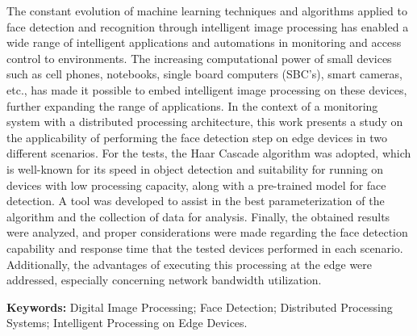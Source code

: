 \captionsenglish

\begin{resumo}
    The constant evolution of machine learning techniques and algorithms applied to face detection and recognition through intelligent image processing has enabled a wide range of intelligent applications and automations in monitoring and access control to environments. The increasing computational power of small devices such as cell phones, notebooks, single board computers (SBC's), smart cameras, etc., has made it possible to embed intelligent image processing on these devices, further expanding the range of applications. In the context of a monitoring system with a distributed processing architecture, this work presents a study on the applicability of performing the face detection step on edge devices in two different scenarios. For the tests, the Haar Cascade algorithm was adopted, which is well-known for its speed in object detection and suitability for running on devices with low processing capacity, along with a pre-trained model for face detection. A tool was developed to assist in the best parameterization of the algorithm and the collection of data for analysis. Finally, the obtained results were analyzed, and proper considerations were made regarding the face detection capability and response time that the tested devices performed in each scenario. Additionally, the advantages of executing this processing at the edge were addressed, especially concerning network bandwidth utilization.
 \vspace{0.5cm}
 
\textbf{Keywords:} Digital Image Processing; Face Detection; Distributed Processing Systems; Intelligent Processing on Edge Devices.
\end{resumo}
\captionsbrazil